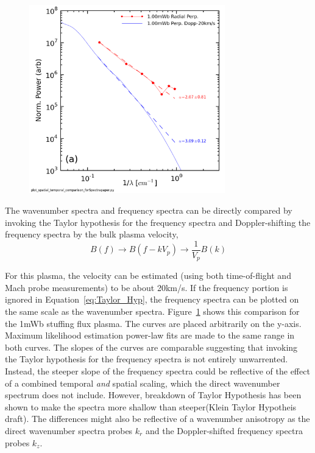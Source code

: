 \documentclass[aip,prl,amsmath,amssymb,reprint,superscriptaddress]{revtex4-1} %
\begin{document}
\begin{figure}[!htbp]
\centerline{
\includegraphics[width=8.5cm]{B_spatial_temporal_comp_wFits_40t60us}}
\caption{\label{fig:wavenumber_comp}}
\end{figure}

The wavenumber spectra and frequency spectra can be directly compared by invoking the Taylor hypothesis for the frequency spectra and Doppler-shifting the frequency spectra by the bulk plasma velocity,
\begin{equation}
B(f) \longrightarrow B(f-kV_{p}) \longrightarrow \frac{1}{V_{p}}B(k)
\label{eq:Taylor_Hyp}
\end{equation}

For this plasma, the velocity can be estimated (using both time-of-flight and Mach probe measurements) to be about 20km/s. If the frequency portion is ignored in Equation~\ref{eq:Taylor_Hyp}, the frequency spectra can be plotted on the same scale as the wavenumber spectra. Figure~\ref{fig:wavenumber_comp} shows this comparison for the 1mWb stuffing flux plasma. The curves are placed arbitrarily on the y-axis. Maximum likelihood estimation power-law fits are made to the same range in both curves. The slopes of the curves are comparable suggesting that invoking the Taylor hypothesis for the frequency spectra is not entirely unwarrented. Instead, the steeper slope of the frequency spectra could be reflective of the effect of a combined temporal {\it and} spatial scaling, which the direct wavenumber spectrum does not include. However, breakdown of Taylor Hypothesis has been shown to make the spectra more shallow than steeper(Klein Taylor Hypotheis draft). The differences might also be reflective of a wavenumber anisotropy as the direct wavenumber spectra probes $k_{r}$ and the Doppler-shifted frequency spectra probes $k_{z}$.
\end{document}
